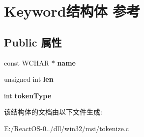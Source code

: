 \hypertarget{struct_keyword}{}\section{Keyword结构体 参考}
\label{struct_keyword}
\subsection*{Public 属性}
\begin{DoxyCompactItemize}
\item 
\mbox{\label{struct_keyword_a24ed834df228666cca299107e9d3e0cf}} 
const W\+C\+H\+AR $\ast$ {\bfseries name}
\item 
\mbox{\label{struct_keyword_a6869ebde85aec712244fa42a9977bb65}} 
unsigned int {\bfseries len}
\item 
\mbox{\label{struct_keyword_a68cdff5cac316ffc766bad0f7a22101f}} 
int {\bfseries token\+Type}
\end{DoxyCompactItemize}


该结构体的文档由以下文件生成\+:\begin{DoxyCompactItemize}
\item 
E\+:/\+React\+O\+S-\/0../dll/win32/msi/tokenize.\+c\end{DoxyCompactItemize}
